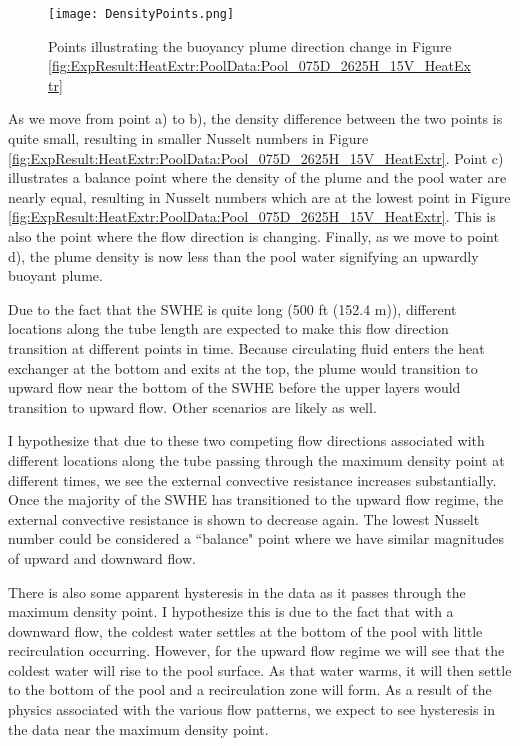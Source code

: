 	\begin{figure}
		\centering
		\texttt{[image: DensityPoints.png]}
		\caption{Points illustrating the buoyancy plume direction change in Figure \ref{fig:ExpResult:HeatExtr:PoolData:Pool_075D_2625H_15V_HeatExtr}}
		\label{fig:ExpResult:HeatExtr:PoolData:DensityPoints}
	\end{figure}
	
As we move from point a) to b), the density difference between the two points is quite small, resulting in smaller Nusselt numbers in Figure \ref{fig:ExpResult:HeatExtr:PoolData:Pool_075D_2625H_15V_HeatExtr}. Point c) illustrates a balance point where the density of the plume and the pool water are nearly equal, resulting in Nusselt numbers which are at the lowest point in Figure \ref{fig:ExpResult:HeatExtr:PoolData:Pool_075D_2625H_15V_HeatExtr}. This is also the point where the flow direction is changing. Finally, as we move to point d), the plume density is now less than the pool water signifying an upwardly buoyant plume.
	
Due to the fact that the SWHE is quite long (500 ft (152.4 m)), different locations along the tube length are expected to make this flow direction transition at different points in time. Because circulating fluid enters the heat exchanger at the bottom and exits at the top, the plume would transition to upward flow near the bottom of the SWHE before the upper layers would transition to upward flow. Other scenarios are likely as well.

I hypothesize that due to these two competing flow directions associated with different locations along the tube passing through the maximum density point at different times, we see the external convective resistance increases substantially. Once the majority of the SWHE has transitioned to the upward flow regime, the external convective resistance is shown to decrease again. The lowest Nusselt number could be considered a ``balance" point where we have similar magnitudes of upward and downward flow.
	
There is also some apparent hysteresis in the data as it passes through the maximum density point. I hypothesize this is due to the fact that with a downward flow, the coldest water settles at the bottom of the pool with little recirculation occurring. However, for the upward flow regime we will see that the coldest water will rise to the pool surface. As that water warms, it will then settle to the bottom of the pool and a recirculation zone will form. As a result of the physics associated with the various flow patterns, we expect to see hysteresis in the data near the maximum density point.


